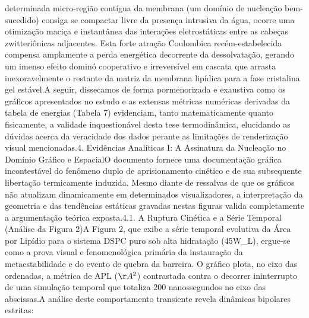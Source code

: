 determinada micro-região contígua da membrana (um domínio de nucleação bem-sucedido) consiga se compactar livre da presença intrusiva da água, ocorre uma otimização maciça e instantânea das interações eletrostáticas entre as cabeças zwitteriônicas adjacentes. Esta forte atração Coulombica recém-estabelecida compensa amplamente a perda energética decorrente da dessolvatação, gerando um imenso efeito dominó cooperativo e irreversível em cascata que arrasta inexoravelmente o restante da matriz da membrana lipídica para a fase cristalina gel estável.A seguir, dissecamos de forma pormenorizada e exaustiva como os gráficos apresentados no estudo e as extensas métricas numéricas derivadas da tabela de energias (Tabela 7) evidenciam, tanto matematicamente quanto fisicamente, a validade inquestionável desta tese termodinâmica, elucidando as dúvidas acerca da veracidade dos dados perante as limitações de renderização visual mencionadas.4. Evidências Analíticas I: A Assinatura da Nucleação no Domínio Gráfico e EspacialO documento fornece uma documentação gráfica incontestável do fenômeno duplo de aprisionamento cinético e de sua subsequente libertação termicamente induzida. Mesmo diante de ressalvas de que os gráficos não atualizam dinamicamente em determinados visualizadores, a interpretação da geometria e das tendências estáticas gravadas nestas figuras valida completamente a argumentação teórica exposta.4.1. A Ruptura Cinética e a Série Temporal (Análise da Figura 2)A Figura 2, que exibe a série temporal evolutiva da Área por Lipídio para o sistema DSPC puro sob alta hidratação (45W\_L), ergue-se como a prova visual e fenomenológica primária da instauração da metaestabilidade e do evento de quebra da barreira. O gráfico plota, no eixo das ordenadas, a métrica de APL ($\AA^2$) contrastada contra o decorrer ininterrupto de uma simulação temporal que totaliza 200 nanossegundos no eixo das abscissas.A análise deste comportamento transiente revela dinâmicas bipolares estritas:
